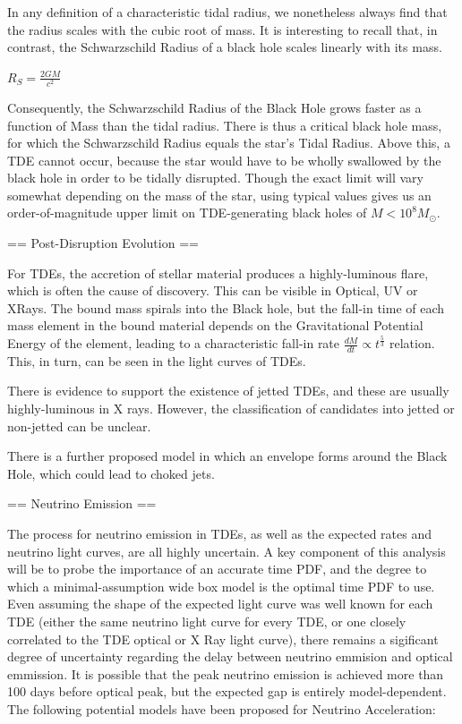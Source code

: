 \documentclass[]{article}
\begin{document}
In any definition of a characteristic tidal radius, we nonetheless always find that the radius scales with the cubic root of mass. It is interesting to recall that, in contrast, the Schwarzschild Radius of a black hole scales linearly with its mass. 

$R_{S} = \frac{2GM}{c^{2}}$

Consequently, the Schwarzschild Radius of the Black Hole grows faster as a function of Mass than the tidal radius. There is thus a critical black hole mass, for which the Schwarzschild Radius equals the star's Tidal Radius. Above this, a TDE cannot occur, because the star would have to be wholly swallowed by the black hole in order to be tidally disrupted. Though the exact limit will vary somewhat depending on the mass of the star, using typical values gives us an order-of-magnitude upper limit on TDE-generating black holes of $M < 10^{8} M_{\odot}$.

== Post-Disruption Evolution ==

For TDEs, the accretion of stellar material produces a highly-luminous flare, which is often the cause of discovery. This can be visible in Optical, UV or XRays. The bound mass spirals into the Black hole, but the fall-in time of each mass element in the bound material depends on the Gravitational Potential Energy of the element, leading to a characteristic fall-in rate $ \frac{dM}{dt} \propto t^{\frac{5}{3}}$ relation. This, in turn, can be seen in the light curves of TDEs.

There is evidence to support the existence of jetted TDEs, and these are usually highly-luminous in X rays. However, the classification of candidates into jetted or non-jetted can be unclear.

There is a further proposed model in which an envelope forms around the Black Hole, which could lead to choked jets.

== Neutrino Emission ==

The process for neutrino emission in TDEs, as well as the expected rates and neutrino light curves, are all highly uncertain. A key component of this analysis will be to probe the importance of an accurate time PDF, and the degree to which a minimal-assumption wide box model is the optimal time PDF to use. Even assuming the shape of the expected light curve was well known for each TDE (either the same neutrino light curve for every TDE,  or one closely correlated to the TDE optical or X Ray light curve), there remains a sigificant degree of uncertainty regarding the delay between neutrino emmision and optical emmission. It is possible that the peak neutrino emission is achieved more than 100 days before optical peak, but the expected gap is entirely model-dependent. The following potential models have been proposed for Neutrino Acceleration:
\end{document}
